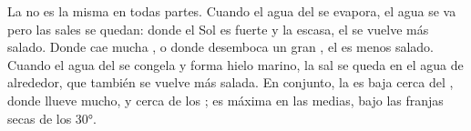 La  no es la misma en todas partes. Cuando el agua del  se
evapora, el agua se va pero las sales se quedan: donde el Sol es fuerte y
la  escasa, el  se vuelve más salado. Donde cae mucha , o
donde desemboca un gran , el  es menos salado. Cuando el agua del 
se congela y forma hielo marino, la sal se queda en el agua de alrededor,
que también se vuelve más salada. En conjunto, la  es baja cerca
del , donde llueve mucho, y cerca de los ; es máxima en las
 medias, bajo las franjas secas de los \ang{30}.

